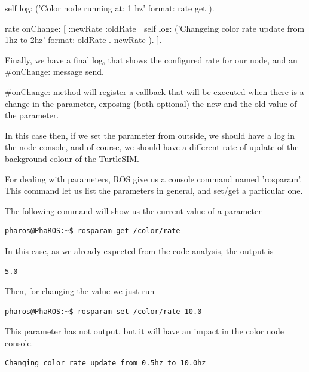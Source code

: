 \documentclass[a4paper,10pt,twoside]{book}
\begin{document}
		\begin{code}	
	self log: ('Color node running at: {1} hz' format: { rate get }).
		
	rate onChange: [ :newRate :oldRate | 
		self log: ('Changeing color rate update from {1}hz to {2}hz' format: { oldRate . newRate }).	
	 ].
		\end{code}
		
		
		Finally, we have a final log, that shows the configured rate for our node, and an \#onChange:	 message send. 
		
		
		\#onChange: method will register a callback that will be executed when there is a change in the parameter, exposing (both optional) the new and the old value of the parameter.
			 
		In this case then, if we set the parameter from outside, we should have a log in the node console, and of course, we should have a different rate of update of the background colour of the TurtleSIM.
		
		
		For dealing with parameters, ROS give us a console command named 'rosparam'. This command let us list the parameters in general, and set/get a particular one.
		
		The following command will show us the current value of a parameter
		
		\begin{lstlisting}[language=bash,title={ rosparam - get }]
			pharos@PhaROS:~$ rosparam get /color/rate 
		\end{lstlisting} 
		
		In this case, as we already expected from the code analysis, the output is 
			 			 
		\begin{lstlisting}[language=bash,title={ rosparam - get - output}]
			5.0 
		\end{lstlisting} 

		Then, for changing the value we just run
		
		\begin{lstlisting}[language=bash,title={ rosparam - set }]
			pharos@PhaROS:~$ rosparam set /color/rate 10.0
		\end{lstlisting} 
			 			 
		This parameter has not output, but it will have an impact in the color node console. 
			 			
			
		\begin{lstlisting}[language=bash,title={ Donatello/Color - Output }]
			Changing color rate update from 0.5hz to 10.0hz

		\end{lstlisting} 
			
\end{document}
